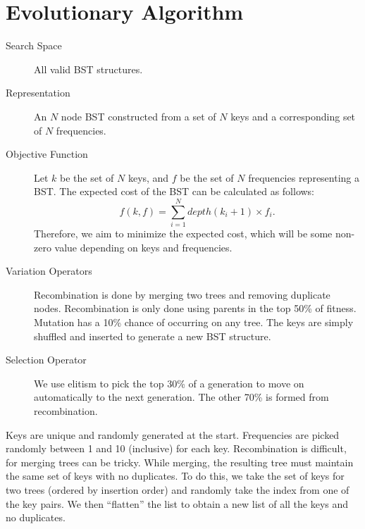 
\section{Evolutionary Algorithm}
\label{sec-algorithm}

\begin{description}
    \item[Search Space] All valid BST structures.
    \item[Representation] An $N$ node BST constructed from a set of $N$ keys and a corresponding set of $N$ frequencies.
    \item[Objective Function] Let $k$ be the set of $N$ keys, and $f$ be the set of $N$ frequencies representing a BST. The expected cost of the BST can be calculated as follows:
    \begin{equation*}
        f(k, f) = \sum_{i=1}^{N} depth(k_i + 1) \times f_i.
    \end{equation*}
    Therefore, we aim to minimize the expected cost, which will be some non-zero value depending on keys and frequencies.
    \item[Variation Operators] Recombination is done by merging two trees and removing duplicate nodes. Recombination is only done using parents in the top 50\% of fitness. Mutation has a 10\% chance of occurring on any tree. The keys are simply shuffled and inserted to generate a new BST structure.
    \item[Selection Operator] We use elitism to pick the top 30\% of a generation to move on automatically to the next generation. The other 70\% is formed from recombination.
\end{description}

Keys are unique and randomly generated at the start. Frequencies are picked randomly between 1 and 10 (inclusive) for each key. Recombination is difficult, for merging trees can be tricky. While merging, the resulting tree must maintain the same set of keys with no duplicates. To do this, we take the set of keys for two trees (ordered by insertion order) and randomly take the index from one of the key pairs. We then ``flatten'' the list to obtain a new list of all the keys and no duplicates.
